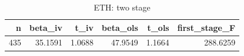 \begin{table}
\caption{ETH: two stage}
\label{tab:t7_two_stage_ETH}
\begin{tabular}{rrrrrr}
\toprule
n & beta\_iv & t\_iv & beta\_ols & t\_ols & first\_stage\_F \\
\midrule
435 & 35.1591 & 1.0688 & 47.9549 & 1.1664 & 288.6259 \\
\bottomrule
\end{tabular}
\end{table}
